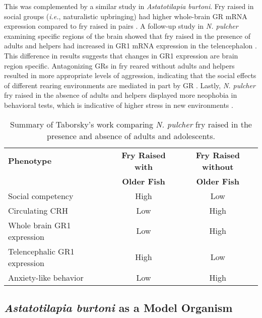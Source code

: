\documentclass[12pt,twoside]{reedthesis}
\begin{document}
This was complemented by a similar study in \textit{Astatotilapia burtoni}. Fry raised
in social groups (\textit{i.e.}, naturalistic upbringing) had higher
whole-brain GR mRNA expression compared to fry raised in pairs \citep{solomon-lane_early-life_2018}. 
A follow-up study in \textit{N. pulcher} examining specific regions of the brain
showed that fry raised in the presence of adults and helpers had increased in
GR1 mRNA expression in the telencephalon \citep{nyman_effect_2017}. This difference in results suggests
that changes in GR1 expression are brain region specific. Antagonizing GRs in fry reared without adults and helpers resulted in more appropriate
levels of aggression, indicating that the social effects of different rearing
environments are mediated in part by GR \citep{nyman_effect_2017}. Lastly,
\textit{N. pulcher} fry raised in
the absence of adults and helpers displayed more neophobia in behavioral tests,
which is indicative of higher stress in new environments \citep{bannier_early_2017}. 

\begin{table}[htbp]
\caption[Summary of Taborsky's work comparing \textit{N. pulcher} fry raised in the presence and absence
of adults and adolescents]{Summary of Taborsky's work comparing \textit{N. pulcher} fry raised in the presence and absence
of adults and adolescents.}
\begin{center}
\footnotesize
\begin{tabular}{ | l | c | c | }
  \hline
  \textbf{Phenotype} & \textbf{Fry Raised with} & \textbf{Fry Raised without} \\
  & \textbf{Older Fish} & \textbf{Older Fish} \\
\hline
  Social competency & High & Low\\
\hline
  Circulating CRH & Low & High\\
\hline
  Whole brain GR1 expression & Low & High\\
\hline
  Telencephalic GR1 expression & High & Low\\
\hline
  Anxiety-like behavior & Low & High\\
\hline
\end{tabular}
\end{center}
\end{table}

\subsection{\textit{Astatotilapia burtoni} as a Model Organism}
\end{document}
